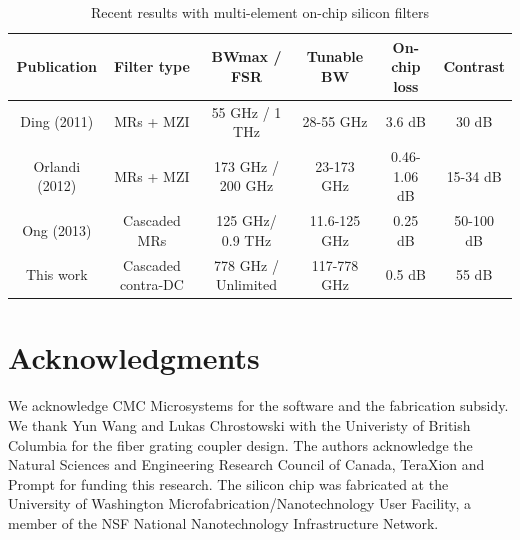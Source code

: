 \documentclass[osajnl,twocolumn,showpacs,superscriptaddress,10pt]{revtex4-1}
\begin{document}
\begin{table}[t]
\caption{Recent results with multi-element on-chip silicon filters}
\begin{tabular}{cccccc}
    \hline
	Publication & Filter type & BWmax / FSR & Tunable BW & On-chip loss & Contrast \\
    \hline
    Ding (2011) &	MRs + MZI &	55 GHz / 1 THz &	28-55 GHz &	3.6 dB &	30 dB
     \\
 	Orlandi (2012) &	MRs + MZI &	173 GHz / 200 GHz &	23-173 GHz &	0.46-1.06 dB &	15-34 dB
      \\
    Ong (2013)\cite{ong2013ultra} &	Cascaded MRs &	125 GHz/ 0.9 THz &	11.6-125 GHz &	0.25 dB &	50-100 dB
      \\
    This work & Cascaded contra-DC &	778 GHz / Unlimited  &	117-778 GHz &	0.5 dB &	55 dB \\
    
    \hline
   \end{tabular}
    \end{table}





\section*{Acknowledgments}
We acknowledge CMC Microsystems for the  software and the fabrication subsidy. We thank Yun Wang and Lukas Chrostowski with the Univeristy of British Columbia for the fiber grating coupler design. The authors acknowledge the Natural Sciences and Engineering Research Council of Canada, TeraXion and Prompt for funding this research. The silicon chip was fabricated at the University of Washington Microfabrication/Nanotechnology User Facility, a member of the NSF National Nanotechnology Infrastructure Network.



\end{document}
